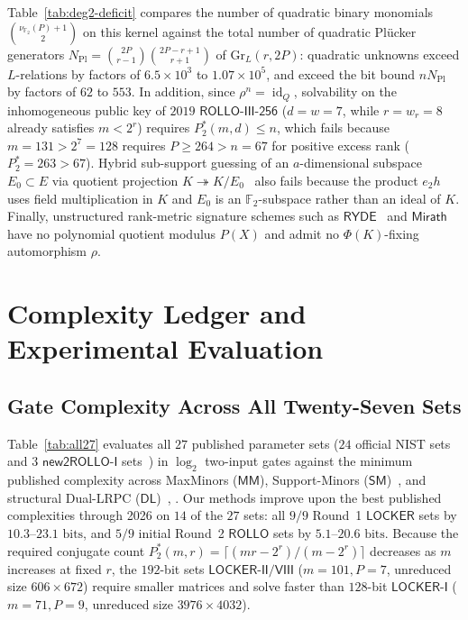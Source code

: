 \documentclass[11pt,a4paper]{article}
\theoremstyle{definition}
\theoremstyle{remark}
\newcommand{\Ftwo}{\mathbb{F}_2}
\newcommand{\Gr}{\mathrm{Gr}}
\begin{document}
Table~\ref{tab:deg2-deficit} compares the number of quadratic binary monomials $\binom{\nu_{\Ftwo}(P)+1}{2}$ on this kernel against the total number of quadratic Pl\"{u}cker generators $N_{\text{Pl}} = \binom{2P}{r-1}\binom{2P-r+1}{r+1}$ of $\Gr_L(r, 2P)$: quadratic unknowns exceed $L$-relations by factors of $6.5\times 10^3$ to $1.07\times 10^5$, and exceed the bit bound $n N_{\text{Pl}}$ by factors of $62$ to $553$. In addition, since $\rho^n = \operatorname{id}_Q$, solvability on the inhomogeneous public key of $2019$ $\mathsf{ROLLO\text{-}III\text{-}256}$ ($d = w = 7$, while $r = w_r = 8$ already satisfies $m < 2^r$) requires $P_2^*(m, d) \le n$, which fails because $m = 131 > 2^7 = 128$ requires $P \ge 264 > n = 67$ for positive excess rank ($P_2^* = 263 > 67$). Hybrid sub-support guessing of an $a$-dimensional subspace $E_0 \subset E$ via quotient projection $K \twoheadrightarrow K / E_0$~\cite{BBC+20,CWZ26} also fails because the product $e_2 h$ uses field multiplication in $K$ and $E_0$ is an $\Ftwo$-subspace rather than an ideal of $K$. Finally, unstructured rank-metric signature schemes such as $\mathsf{RYDE}$~\cite{RYDE25} and $\mathsf{Mirath}$~\cite{Mirath25} have no polynomial quotient modulus $P(X)$ and admit no $\Phi(K)$-fixing automorphism $\rho$.

\section{Complexity Ledger and Experimental Evaluation}
\label{sec:evaluation}

\subsection{Gate Complexity Across All Twenty-Seven Sets}
Table~\ref{tab:all27} evaluates all $27$ published parameter sets ($24$ official NIST sets and $3$ $\mathsf{new2ROLLO\text{-}I}$ sets~\cite{BBC+20}) in $\log_2$ two-input gates against the minimum published complexity across MaxMinors ($\mathsf{MM}$), Support-Minors ($\mathsf{SM}$)~\cite{BBGT23,EVV26}, and structural Dual-LRPC ($\mathsf{DL}$)~\cite[\S6.2]{ROLLO20}, \cite{SZHW23}. Our methods improve upon the best published complexities through 2026 on $14$ of the $27$ sets: all $9/9$ Round~1 $\mathsf{LOCKER}$ sets by $10.3\text{--}23.1\text{ bits}$, and $5/9$ initial Round~2 $\mathsf{ROLLO}$ sets by $5.1\text{--}20.6\text{ bits}$. Because the required conjugate count $P_2^*(m,r) = \lceil(mr - 2^r)/(m - 2^r)\rceil$ decreases as $m$ increases at fixed $r$, the $192$-bit sets $\mathsf{LOCKER\text{-}II/VIII}$ ($m = 101, P = 7$, unreduced size $606 \times 672$) require smaller matrices and solve faster than $128$-bit $\mathsf{LOCKER\text{-}I}$ ($m = 71, P = 9$, unreduced size $3976 \times 4032$).
\end{document}
